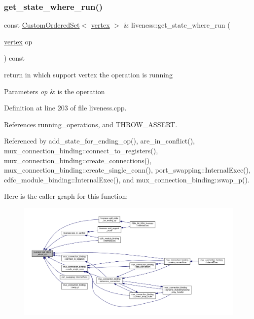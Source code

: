 \subsubsection{\texorpdfstring{get\+\_\+state\+\_\+where\+\_\+run()}{get\_state\_where\_run()}}
{\footnotesize\ttfamily const \hyperlink{classCustomOrderedSet}{Custom\+Ordered\+Set}$<$ \hyperlink{graph_8hpp_abefdcf0544e601805af44eca032cca14}{vertex} $>$ \& liveness\+::get\+\_\+state\+\_\+where\+\_\+run (\begin{DoxyParamCaption}\item[{\hyperlink{graph_8hpp_abefdcf0544e601805af44eca032cca14}{vertex}}]{op }\end{DoxyParamCaption}) const}



return in which support vertex the operation is running 


\begin{DoxyParams}{Parameters}
{\em op} & is the operation \\
\hline
\end{DoxyParams}


Definition at line 203 of file liveness.\+cpp.



References running\+\_\+operations, and T\+H\+R\+O\+W\+\_\+\+A\+S\+S\+E\+RT.



Referenced by add\+\_\+state\+\_\+for\+\_\+ending\+\_\+op(), are\+\_\+in\+\_\+conflict(), mux\+\_\+connection\+\_\+binding\+::connect\+\_\+to\+\_\+registers(), mux\+\_\+connection\+\_\+binding\+::create\+\_\+connections(), mux\+\_\+connection\+\_\+binding\+::create\+\_\+single\+\_\+conn(), port\+\_\+swapping\+::\+Internal\+Exec(), cdfc\+\_\+module\+\_\+binding\+::\+Internal\+Exec(), and mux\+\_\+connection\+\_\+binding\+::swap\+\_\+p().

Here is the caller graph for this function\+:
\nopagebreak
\begin{figure}[H]
\begin{center}
\leavevmode
\includegraphics[width=350pt]{d3/d1f/classliveness_adf512e3be101982e75ace23f6c1a096d_icgraph}
\end{center}
\end{figure}
\mbox{\label{classliveness_a6f96d3e472466ac40bf1ab8fdd59adc4}} 
